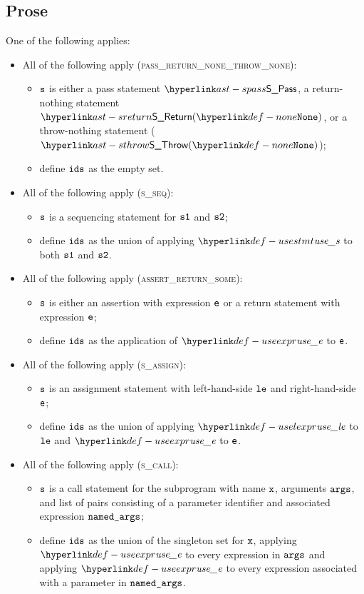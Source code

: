 \subsection{Prose}
One of the following applies:
\begin{itemize}
  \item All of the following apply (\textsc{pass\_return\_none\_throw\_none}):
  \begin{itemize}
    \item $\texttt{s}$ is either a pass statement $\SPass$, a return-nothing statement $\SReturn(\None)$,
          or a throw-nothing statement ($\SThrow(\None)$);
    \item define $\texttt{ids}$ as the empty set.
  \end{itemize}

  \item All of the following apply (\textsc{s\_seq}):
  \begin{itemize}
    \item $\texttt{s}$ is a sequencing statement for $\texttt{s1}$ and $\texttt{s2}$;
    \item define $\texttt{ids}$ as the union of applying $\usestmt$ to both $\texttt{s1}$ and $\texttt{s2}$.
  \end{itemize}

  \item All of the following apply (\textsc{assert\_return\_some}):
  \begin{itemize}
    \item $\texttt{s}$ is either an assertion with expression $\texttt{e}$ or a return statement with expression $\texttt{e}$;
    \item define $\texttt{ids}$ as the application of $\useexpr$ to $\texttt{e}$.
  \end{itemize}

  \item All of the following apply (\textsc{s\_assign}):
  \begin{itemize}
    \item $\texttt{s}$ is an assignment statement with left-hand-side $\texttt{le}$ and right-hand-side $\texttt{e}$;
    \item define $\texttt{ids}$ as the union of applying $\uselexpr$ to $\texttt{le}$ and $\useexpr$ to $\texttt{e}$.
  \end{itemize}

  \item All of the following apply (\textsc{s\_call}):
  \begin{itemize}
    \item $\texttt{s}$ is a call statement for the subprogram with name $\texttt{x}$, arguments $\texttt{args}$, and list of
          pairs consisting of a parameter identifier and associated expression $\texttt{named\_args}$;
    \item define $\texttt{ids}$ as the union of the singleton set for $\texttt{x}$, applying $\useexpr$ to
          every expression in $\texttt{args}$ and applying $\useexpr$ to every expression associated with
          a parameter in $\texttt{named\_args}$.
  \end{itemize}


\end{itemize}
